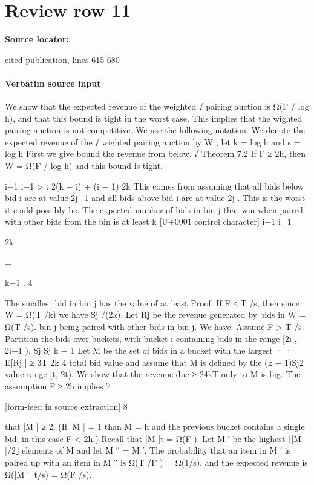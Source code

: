 \documentclass[10pt]{article}
\begin{document}
\section*{Review row 11}
\textbf{Source locator:} {\footnotesize\raggedright cited publication, lines 615-\allowbreak{}680\par}
\paragraph{Verbatim source input}
\begin{ReviewVerbatim}
We show that the expected
revenue of the weighted
√
pairing auction is Ω(F / log h), and that this bound
is tight in the worst case. This implies that the
wighted pairing auction is not competitive.
We use the following notation. We denote the expected revenue of the √
wighted pairing auction by W ,
let k = log h and s = log h First we give bound the
revenue from below.
√
Theorem 7.2 If F ≥ 2h, then W = Ω(F / log h)
and this bound is tight.

i−1
i−1
>
.
2(k − i) + (i − 1)
2k
This comes from assuming that all bids below bid i
are at value 2j−1 and all bids above bid i are at value
2j . This is the worst it could possibly be. The expected number of bids in bin j that win when paired
with other bids from the bin is at least
k
[U+0001 control character]
i−1
i=1

2k

=

k−1
.
4

The smallest bid in bin j has the value of at least Proof. If F ≤ T /s, then since W = Ω(T /k) we have
Sj /(2k). Let Rj be the revenue generated by bids in W = Ω(T /s).
bin j being paired with other bids in bin j. We have:
Assume F > T /s. Partition the bids over buckets,
with bucket i containing bids in the range [2i , 2i+1 ).
Sj Sj k − 1
Let M be the set of bids in a bucket with the largest
·
·
E[Rj ] ≥
3T 2k
4
total bid value and assume that M is defined by the
(k − 1)Sj2
value range [t, 2t). We show that the revenue due
≥
24kT
only to M is big. The assumption F ≥ 2h implies
7


[form-feed in source extraction]
8

that |M | ≥ 2. (If |M | = 1 than M = {h} and the
previous bucket contains a single bid; in this case
F < 2h.) Recall that |M |t = Ω(F ). Let M ′ be the
highest ⌊|M |/2⌋ elements of M and let M ′′ = M \M ′.
The probability that an item in M ′ is paired up
with an item in M ′′ is Ω(T /F ) = Ω(1/s), and the
expected revenue is Ω(|M ′ |t/s) = Ω(F /s).
\end{ReviewVerbatim}
\end{document}
